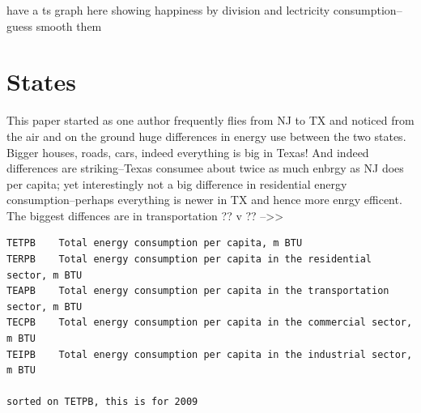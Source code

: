 \documentclass[10pt, letterpaper]{article}
\begin{document}
\begin{spacing}{1.4}
have a ts graph here showing happiness by division and lectricity
consumption--guess smooth them

\section{States}

This paper started as one author frequently flies from NJ to TX and noticed from
the air and on the ground huge differences in energy use between the two
states. Bigger houses, roads, cars, indeed everything is big in Texas! And
indeed differences are striking--Texas consumee about twice as much enbrgy as NJ
does per capita; yet interestingly not a big difference in residential energy
consumption--perhaps everything is newer in TX and hence more enrgy
efficent. The biggest diffences are in transportation ?? v ?? -->>


\begin{spacing}{.8}
{\footnotesize
\begin{verbatim}
TETPB    Total energy consumption per capita, m BTU
TERPB    Total energy consumption per capita in the residential sector, m BTU
TEAPB    Total energy consumption per capita in the transportation sector, m BTU
TECPB    Total energy consumption per capita in the commercial sector, m BTU
TEIPB    Total energy consumption per capita in the industrial sector, m BTU

sorted on TETPB, this is for 2009


\end{verbatim}}
\end{spacing}
\end{spacing}
\end{document}
